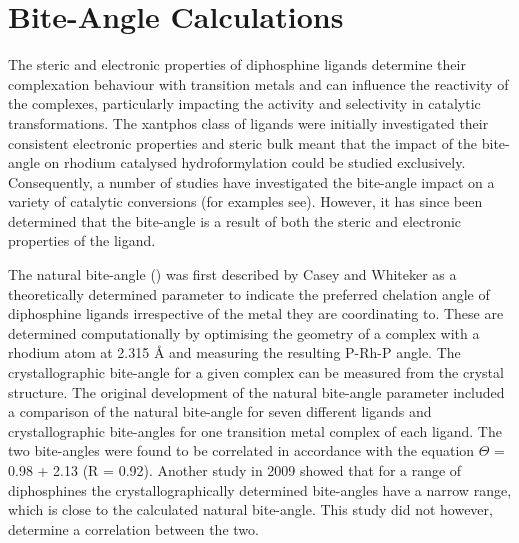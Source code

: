 
\section{Bite-Angle Calculations}
\label{section:biteangle}

The steric and electronic properties of diphosphine ligands determine their complexation behaviour with transition metals and can influence the reactivity of the complexes, particularly impacting the activity and selectivity in catalytic transformations.\cite{Freixa2003, Birkholz2009}  The xantphos class of ligands were initially investigated their consistent electronic properties and steric bulk meant that the impact of the bite-angle on rhodium catalysed hydroformylation could be studied exclusively.\cite{Kranenburg1995}  Consequently, a number of studies have investigated the bite-angle impact on a variety of catalytic conversions (for examples see\cite{Kranenburg1995b, Haaren2001b, Dudle2011b, Fanjul2013, Birkholz2009}).  However, it has since been determined that the bite-angle is a result of both the steric and electronic properties of the ligand.\cite{Freixa2003}

The natural bite-angle (\natbiteangle) was first described by Casey and Whiteker\cite{Casey1990} as a theoretically determined parameter to indicate the preferred chelation angle of diphosphine ligands irrespective of the metal they are coordinating to.  These are determined computationally by optimising the geometry of a complex with a rhodium atom at 2.315 \si{\angstrom} and measuring the resulting P-Rh-P angle.  The crystallographic bite-angle for a given complex can be measured from the crystal structure.  The original development of the natural bite-angle parameter included a comparison of the natural bite-angle for seven different ligands and crystallographic bite-angles for one transition metal complex of each ligand.  The two bite-angles were found to be correlated in accordance with the equation $\Theta$ = 0.98\natbiteangle{} + 2.13 (R = 0.92).\cite{Casey1990}  Another study in 2009 showed that for a range of diphosphines the crystallographically determined bite-angles have a narrow range, which is close to the calculated natural bite-angle.\cite{Dierkes1999}  This study did not however, determine a correlation between the two.


